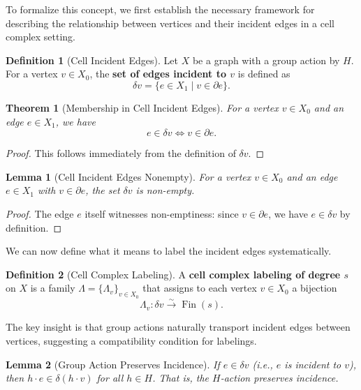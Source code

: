 \documentclass[11pt]{article}
\theoremstyle{plain}
\newtheorem*{theorem}{Theorem}
\newtheorem*{lemma}{Lemma}
\theoremstyle{definition}
\newtheorem*{definition}{Definition}
\theoremstyle{remark}
\begin{document}
To formalize this concept, we first establish the necessary framework for describing the relationship between vertices and their incident edges in a cell complex setting.

\begin{definition}[Cell Incident Edges]
Let $X$ be a graph with a group action by $H$. For a vertex $v \in X_0$, the \textbf{set of edges incident to $v$} is defined as
\[
\delta v = \{ e \in X_1 \mid v \in \partial e \}.
\]
\end{definition}

\begin{theorem}[Membership in Cell Incident Edges]
For a vertex $v \in X_0$ and an edge $e \in X_1$, we have
\[
e \in \delta v \iff v \in \partial e.
\]
\end{theorem}

\begin{proof}
This follows immediately from the definition of $\delta v$.
\end{proof}

\begin{lemma}[Cell Incident Edges Nonempty]
For a vertex $v \in X_0$ and an edge $e \in X_1$ with $v \in \partial e$, the set $\delta v$ is non-empty.
\end{lemma}

\begin{proof}
The edge $e$ itself witnesses non-emptiness: since $v \in \partial e$, we have $e \in \delta v$ by definition.
\end{proof}

We can now define what it means to label the incident edges systematically.

\begin{definition}[Cell Complex Labeling]
A \textbf{cell complex labeling of degree $s$} on $X$ is a family $\Lambda = \{\Lambda_v\}_{v \in X_0}$ that assigns to each vertex $v \in X_0$ a bijection
\[
\Lambda_v : \delta v \xrightarrow{\sim} \operatorname{Fin}(s).
\]
\end{definition}

The key insight is that group actions naturally transport incident edges between vertices, suggesting a compatibility condition for labelings.

\begin{lemma}[Group Action Preserves Incidence]
If $e \in \delta v$ (i.e., $e$ is incident to $v$), then $h \cdot e \in \delta(h \cdot v)$ for all $h \in H$. That is, the $H$-action preserves incidence.
\end{lemma}
\end{document}
